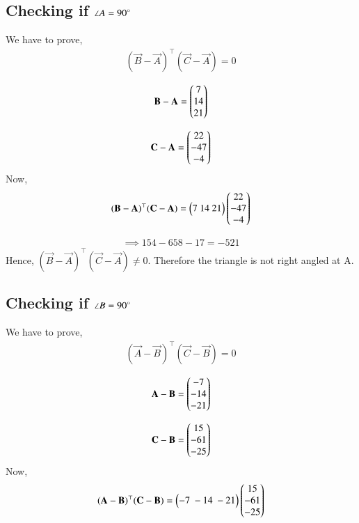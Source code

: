 \documentclass[journal,12pt,twocolumn]{IEEEtran}
\begin{document}
\subsection{Checking if $\angle A ={90}\degree$}
We have to prove,
\begin{align}
   (\vec{B}-\vec{A})^\top(\vec{C}-\vec{A})=0
\end{align}

\begin{align}
    \mathbf B - \mathbf A = \begin{pmatrix}7\\14\\21\end{pmatrix}
\end{align}

\begin{align}
     \mathbf C - \mathbf A = \begin{pmatrix}22\\-47\\-4\end{pmatrix}
\end{align}
Now,
\begin{align}
     (\vec{B}-\vec{A})^\top(\vec{C}-\vec{A})=\myvec{7\ 14\ 21}\myvec{22\\-47\\-4}
\end{align}

\begin{align}
\implies 154-658-17 = -521
\end{align}
 Hence,  $(\vec{B}-\vec{A})^\top(\vec{C}-\vec{A})\neq 0$. Therefore the triangle is not right angled at A.

\subsection{Checking if $\angle B ={90}\degree$}
We have to prove,
\begin{align}
   (\vec{A}-\vec{B})^\top(\vec{C}-\vec{B})=0
\end{align}

\begin{align}
    \mathbf A - \mathbf B = \begin{pmatrix}-7\\-14\\-21\end{pmatrix}
\end{align}

\begin{align}
     \mathbf C - \mathbf B = \begin{pmatrix}15\\-61\\-25\end{pmatrix}
\end{align}
Now,
\begin{align}
     (\vec{A}-\vec{B})^\top(\vec{C}-\vec{B})=\myvec{-7\ -14\ -21}\myvec{15\\-61\\-25}
\end{align}
\end{document}

